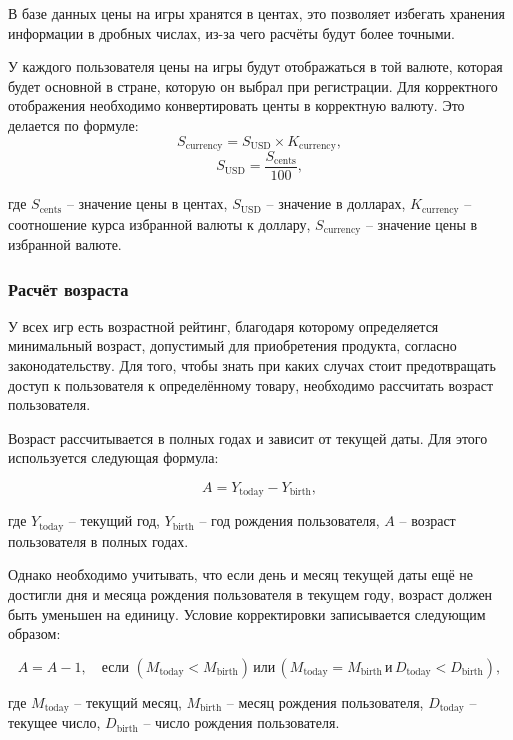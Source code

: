 \documentclass[a4paper,14pt]{extarticle}
\begin{document}
	В базе данных цены на игры хранятся в центах, это позволяет избегать хранения информации в дробных числах, из-за чего расчёты будут более точными.
	
	У каждого пользователя цены на игры будут отображаться в той валюте, которая будет основной в стране, которую он выбрал при регистрации. Для корректного отображения необходимо конвертировать центы в корректную валюту. Это делается по формуле:\\
	
	\[
	S_{\text{currency}} = S_{\text{USD}} \times K_{\text{currency}},
	\]
	\[
	S_{\text{USD}} = \frac{S_{\text{cents}}}{100},
	\]
	
	где $S_{\text{cents}}$ -- значение цены в центах, $S_{\text{USD}}$ -- значение в долларах, $K_{\text{currency}}$ -- соотношение курса избранной валюты к доллару, $S_{\text{currency}}$ -- значение цены в избранной валюте.\\
	
	\subsubsection{Расчёт возраста}
	
	У всех игр есть возрастной рейтинг, благодаря которому определяется минимальный возраст, допустимый для приобретения продукта, согласно законодательству. Для того, чтобы знать при каких случах стоит предотвращать доступ к пользователя к определённому товару, необходимо рассчитать возраст пользователя.
	
	Возраст рассчитывается в полных годах и зависит от текущей даты. Для этого используется следующая формула:
	
	\[
	A = Y_{\text{today}} - Y_{\text{birth}},
	\]
	
	где $Y_{\text{today}}$ -- текущий год, $Y_{\text{birth}}$ -- год рождения пользователя, $A$ -- возраст пользователя в полных годах.
	
	Однако необходимо учитывать, что если день и месяц текущей даты ещё не достигли дня и месяца рождения пользователя в текущем году, возраст должен быть уменьшен на единицу. Условие корректировки записывается следующим образом:
	
	\[
	A = A - 1, \quad \text{если } (M_{\text{today}} < M_{\text{birth}}) \, \text{или} \, (M_{\text{today}} = M_{\text{birth}} \, \text{и} \, D_{\text{today}} < D_{\text{birth}}),
	\]
	
	где $M_{\text{today}}$ -- текущий месяц, $M_{\text{birth}}$ -- месяц рождения пользователя, $D_{\text{today}}$ -- текущее число, $D_{\text{birth}}$ -- число рождения пользователя.\\
	
\end{document}

